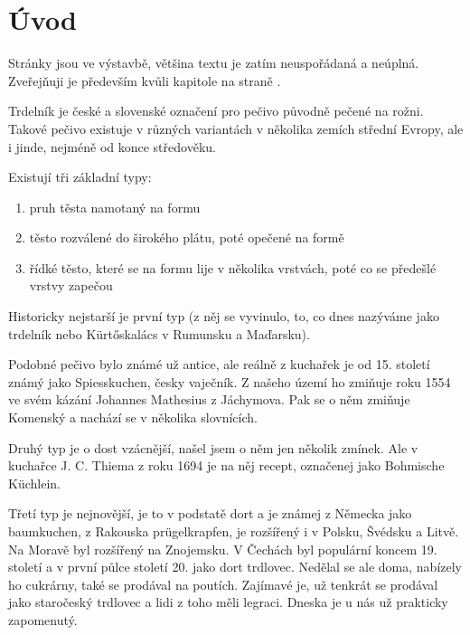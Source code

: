 \chapter*{Úvod}

\begin{tcolorbox}[title=Upozornění]
   Stránky jsou ve výstavbě, většina textu je zatím neuspořádaná a neúplná. Zveřejňuji je především kvůli kapitole  na straně \pageref{Anotovanuxe1ux20chronologickuxe1ux20bibliografie}.
\end{tcolorbox}

Trdelník je české a slovenské označení pro pečivo původně pečené na rožni. Takové pečivo existuje
v různých variantách v několika zemích střední Evropy, ale i jinde, nejméně od konce středověku. 

Existují tři základní typy: 

\begin{enumerate}
  \item pruh těsta namotaný na formu
  \item těsto rozválené do širokého plátu, poté opečené na formě
  \item řídké těsto, které se na formu lije v několika vrstvách, poté co se předešlé vrstvy zapečou
\end{enumerate}

Historicky nejstarší je první typ (z něj se vyvinulo, to, co dnes nazýváme jako trdelník
nebo \foreignlanguage{hungarian}{Kürtőskalács} v Rumunsku a Maďarsku). 

Podobné pečivo bylo známé už antice, ale reálně z
kuchařek je od 15. století známý jako Spiesskuchen, česky vaječník. Z našeho
území ho zmiňuje roku 1554 ve svém kázání Johannes Mathesius z Jáchymova. Pak se o něm
zmiňuje Komenský a nachází se v několika slovnících.

Druhý typ je o dost vzácnější, našel jsem o něm jen několik zmínek. Ale v
kuchařce J. C. Thiema z roku 1694 je na něj recept, označenej jako Bohmische
Küchlein.

Třetí typ je nejnovější, je to v podstatě dort a je známej z Německa jako
baumkuchen, z Rakouska prügelkrapfen, je rozšířený i v Polsku, Švédsku a
Litvě. Na Moravě byl rozšířený na Znojemsku. V Čechách byl populární koncem
19. století a v první půlce století 20. jako dort trdlovec. Nedělal se ale
doma, nabízely ho  cukrárny, také se prodával na poutích. Zajímavé je, už
tenkrát se prodával jako staročeský trdlovec a lidi z toho měli legraci. Dneska
je u nás už prakticky zapomenutý.

